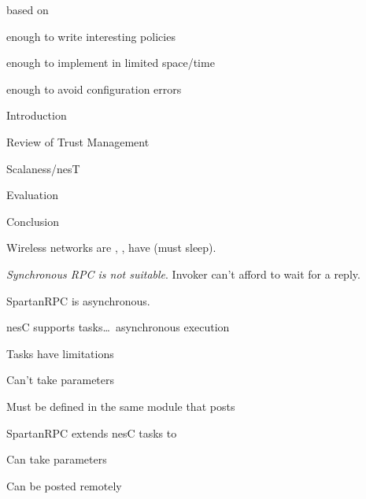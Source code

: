 
\begin{citemize}
\item {} based on \datalog
\item {} enough to write interesting policies
\item {} enough to implement in limited space/time
\item {} enough to avoid configuration errors
\end{citemize}
\stopslide


\begin{cenumerate}
\item Introduction
\item Review of Trust Management
\item {}
\item Scalaness/nesT
\item Evaluation
\item Conclusion
\end{cenumerate}
\stopslide


\begin{citemize}
\item Wireless networks are , , have 
  (must sleep).
\item \emph{Synchronous RPC is not suitable}. Invoker can't afford to wait for a reply.
\item SpartanRPC is asynchronous.
\end{citemize}
\stopslide


\begin{citemize}
\item nesC supports tasks\ldots\ asynchronous execution
\item Tasks have limitations
\begin{citemize}
  \item Can't take parameters
  \item Must be defined in the same module that posts
\end{citemize}
\item SpartanRPC extends nesC tasks to 
\begin{citemize}
  \item Can take parameters
  \item Can be posted remotely
\end{citemize}
\end{citemize}
\stopslide

